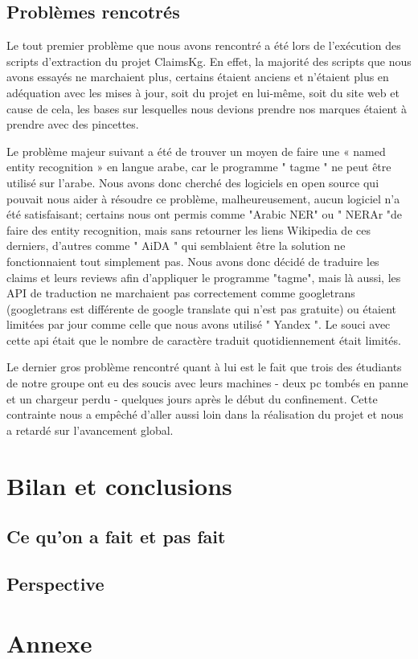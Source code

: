 \documentclass[oneside,13pt,a4paper]{report}
\begin{document}
\section{Problèmes rencotrés}

Le tout premier problème que nous avons rencontré a été lors de l'exécution des scripts d'extraction du projet ClaimsKg. En effet, la majorité des scripts que nous avons essayés ne marchaient plus, certains étaient anciens et n'étaient plus en adéquation avec les mises à jour, soit du projet en lui-même, soit du site web et cause de cela, les bases sur lesquelles nous devions prendre nos marques étaient à prendre avec des pincettes.

Le problème majeur suivant a été de trouver un moyen de faire une « named entity recognition » en langue arabe, car le programme " tagme " ne peut être utilisé sur l'arabe. Nous avons donc cherché des logiciels en open source qui pouvait nous aider à résoudre ce problème, malheureusement, aucun logiciel n'a été satisfaisant; certains nous ont permis comme "Arabic NER" ou " NERAr "de faire des entity recognition, mais sans retourner les liens Wikipedia de ces derniers, d'autres comme " AiDA " qui semblaient être la solution ne fonctionnaient tout simplement pas. Nous avons donc décidé de traduire les claims et leurs reviews afin d'appliquer le programme "tagme", mais là aussi, les API de traduction ne marchaient pas correctement comme googletrans (googletrans est différente de google translate qui n'est pas gratuite) ou étaient limitées par jour comme celle que nous avons utilisé " Yandex ". Le souci avec cette api était que le nombre de caractère traduit quotidiennement était limités.

Le dernier gros problème rencontré quant à lui est le fait que trois des étudiants de notre groupe ont eu des soucis avec leurs machines - deux pc tombés en panne et un chargeur perdu - quelques jours après le début du confinement. Cette contrainte nous a empêché d'aller aussi loin dans la réalisation du projet et nous a retardé sur l'avancement global.

\chapter{Bilan et conclusions}

\section{Ce qu'on a fait et pas fait}

\section{Perspective}



\appendix
\chapter{Annexe}
\end{document}
